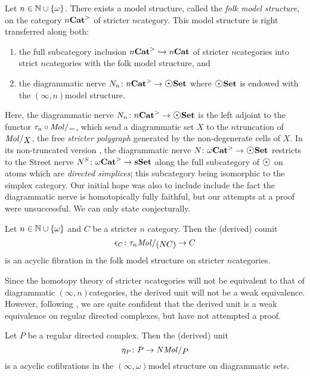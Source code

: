 \begin{thm*}
    Let \( n \in \mathbb{N} \cup \left\{ {\omega} \right\} \).
    There exists a model structure, called the \emph{folk model structure}, on the category \( {n\mathbf{Cat}}^> \) of stricter \( n \)\nbd category.
    This model structure is right transferred along both:
    \begin{enumerate}
        \item the full subcategory inclusion \( {n\mathbf{Cat}}^> \hookrightarrow {n\mathbf{Cat}} \) of stricter \( n \)\nbd categories into strict \( n \)\nbd categories with the folk model structure, and
        \item the diagrammatic nerve \( \N{n} \colon \snCat{n} \to \dgmSet \) where \( \dgmSet \) is endowed with the \( (\infty, n) \)\nbd model structure. 
    \end{enumerate}
\end{thm*}
\noindent Here, the diagrammatic nerve \( \N{n} \colon \snCat{n} \to \dgmSet \) is the left adjoint to the functor \( \trunc{n} \after \molecin{-} \), which send a diagrammatic set \( X \) to the \( n \)\nbd truncation of \( \molecin{X} \), the free \emph{stricter polygraph} generated by the non-degenerate cells of \( X \).
In its non-truncated version , the diagrammatic nerve \( \N{} \colon \somegaCat \to \dgmSet \) restricts to the Street nerve \cite{street1987oriental} \( N^S \colon {\omega\mathbf{Cat}}^> \to \mathbf{sSet} \) along the full subcategory of \( \atom \) on atoms which are \emph{directed simplices}; this subcategory being isomorphic to the simplex category.
Our initial hope was also to include include the fact the diagrammatic nerve is homotopically fully faithful, but our attempts at a proof were unsuccessful.
We can only state conjecturally.
\begin{conj*}
    Let \( n \in \mathbb{N} \cup \left\{ {\omega} \right\} \) and \( C \) be a stricter \( n \) \nbd category. 
    Then the (derived) counit
    \begin{equation*}
        \counit_C \colon \trunc{n} \molecin{(\N{}C)} \to C
    \end{equation*}
    is an acyclic fibration in the folk model structure on stricter \( n \)\nbd categories.
\end{conj*}

\noindent Since the homotopy theory of stricter \( n \)\nbd categories will not be equivalent to that of diagrammatic \( (\infty, n) \)\nbd categories, the derived unit will not be a weak equivalence.
However, following \cite{gagna2023nerve, maehara2023oriental}, we are quite confident that the derived unit is a weak equivalence on regular directed complexes, but have not attempted a proof.
\begin{conj*}
    Let \( P \) be a regular directed complex.
    Then the (derived) unit 
    \begin{equation*}
        \unit_P \colon P \to \N{}\molecin{P}
    \end{equation*}
    is a acyclic cofibrations in the \( (\infty, \omega) \)\nbd model structure on diagrammatic sets. 
\end{conj*}

